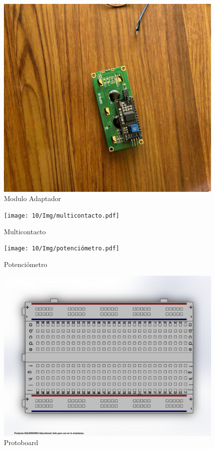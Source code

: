     \begin{figure}[H]
        \centering
        \includegraphics[trim = {30mm 30mm 30mm 30mm},clip,scale=0.2]{10/Img/moduloAdaptador.pdf}
        \caption{Modulo Adaptador}
        \label{Adaptador}
    \end{figure}
    
    \begin{figure}[H]
        \centering
        \texttt{[image: 10/Img/multicontacto.pdf]}
        \caption{Multicontacto}
        \label{Multicontacto}
    \end{figure}
    
    \begin{figure}[H]
        \centering
        \texttt{[image: 10/Img/potenciómetro.pdf]}
        \caption{Potenciómetro}
        \label{Potenciómetro}
    \end{figure}
    
    \begin{figure}[H]
        \centering
        \includegraphics[trim = {30mm 30mm 30mm 30mm},clip,scale=0.2]{10/Img/protoboard.pdf}
        \caption{Protoboard}
        \label{Protoboard}
    \end{figure}
    
